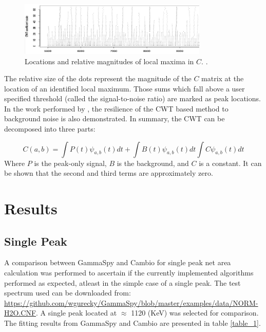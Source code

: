 \documentclass[10pt]{article}
\begin{document}
\begin{figure}[!htbp]
\centering
\includegraphics[width=9cm]{images/cwt_dots.png}
\caption{Locations and relative magnitudes of local maxima in $C$. \cite{Du:2006}.}
\label{cwt_dots}
\end{figure}
The relative size of the dots represent the magnitude of the $C$ matrix at the location of an identified local maximum.
Those sums which fall above a user specified threshold (called the signal-to-noise ratio) are marked as peak locations. \\

In the work performed by \cite{Du:2006}, the resilience of the CWT based method to background noise is also demonstrated.
In summary, the CWT can be decomposed into three parts:

\begin{equation}
    C(a,b) = \int P(t)\psi_{a,b}(t) dt + \int B(t) \psi_{a,b}(t) dt \int C \psi_{a,b} (t)dt
\end{equation}
Where $P$ is the peak-only signal, $B$ is the background, and $C$ is a constant.  It can be shown
that the second and third terms are approximately zero.


\section{Results}


\subsection{Single Peak}
A comparison between GammaSpy and Cambio for single peak net area calculation was performed
to ascertain if the currently implemented algorithms performed as expected, atleast in
the simple case of a single peak.
The test spectrum used can be downloaded from: \url{https://github.com/wgurecky/GammaSpy/blob/master/examples/data/NORM-H2O.CNF}.
A single peak located at $\approx$ 1120 (KeV) was selected for comparison.  The fitting results from
GammaSpy and Cambio are presented in table \ref{table_1}.
\end{document}
